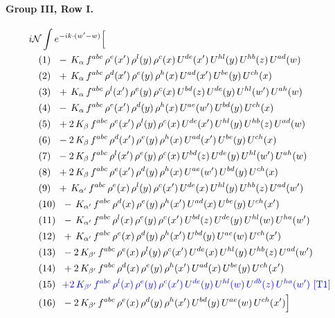 \documentclass[10pt]{article}
\numberwithin{equation}{section}
\newcommand{\NN}{\mathcal N}
\begin{document}
\paragraph{Group III, Row I.}
\begin{align*}
&i\NN\int e^{-ik\cdot(w'-w)}\Big[\\
&\quad\text{(1)}\ \ -\,K_{\alpha}\,f^{abc}\,\rho^{e}(x')\,\rho^{l}(y)\,\rho^{c}(x)\,U^{de}(x')\,U^{hl}(y)\,U^{hb}(z)\,U^{ad}(w)\\
&\quad\text{(2)}\ \ +\,K_{\alpha}\,f^{abc}\,\rho^{d}(x')\,\rho^{e}(y)\,\rho^{h}(x)\,U^{ad}(x')\,U^{be}(y)\,U^{ch}(x)\\
&\quad\text{(3)}\ \ +\,K_{\alpha}\,f^{abc}\,\rho^{l}(x')\,\rho^{e}(y)\,\rho^{c}(x)\,U^{bd}(z)\,U^{de}(y)\,U^{hl}(w')\,U^{ah}(w)\\
&\quad\text{(4)}\ \ -\,K_{\alpha}\,f^{abc}\,\rho^{e}(x')\,\rho^{d}(y)\,\rho^{h}(x)\,U^{ae}(w')\,U^{bd}(y)\,U^{ch}(x)\\
&\quad\text{(5)}\ \ +2\,K_{\beta}\,f^{abc}\,\rho^{e}(x')\,\rho^{l}(y)\,\rho^{c}(x)\,U^{de}(x')\,U^{hl}(y)\,U^{hb}(z)\,U^{ad}(w)\\
&\quad\text{(6)}\ \ -2\,K_{\beta}\,f^{abc}\,\rho^{d}(x')\,\rho^{e}(y)\,\rho^{h}(x)\,U^{ad}(x')\,U^{be}(y)\,U^{ch}(x)\\
&\quad\text{(7)}\ \ -2\,K_{\beta}\,f^{abc}\,\rho^{l}(x')\,\rho^{e}(y)\,\rho^{c}(x)\,U^{bd}(z)\,U^{de}(y)\,U^{hl}(w')\,U^{ah}(w)\\
&\quad\text{(8)}\ \ +2\,K_{\beta}\,f^{abc}\,\rho^{e}(x')\,\rho^{d}(y)\,\rho^{h}(x)\,U^{ae}(w')\,U^{bd}(y)\,U^{ch}(x)\\
&\quad\text{(9)}\ \ +\,K_{\alpha'}\,f^{abc}\,\rho^{e}(x)\,\rho^{l}(y)\,\rho^{c}(x')\,U^{de}(x)\,U^{hl}(y)\,U^{hb}(z)\,U^{ad}(w')\\
&\quad\text{(10)}\ \ -\,K_{\alpha'}\,f^{abc}\,\rho^{d}(x)\,\rho^{e}(y)\,\rho^{h}(x')\,U^{ad}(x)\,U^{be}(y)\,U^{ch}(x')\\
&\quad\text{(11)}\ \ -\,K_{\alpha'}\,f^{abc}\,\rho^{l}(x)\,\rho^{e}(y)\,\rho^{c}(x')\,U^{bd}(z)\,U^{de}(y)\,U^{hl}(w)\,U^{ha}(w')\\
&\quad\text{(12)}\ \ +\,K_{\alpha'}\,f^{abc}\,\rho^{e}(x)\,\rho^{d}(y)\,\rho^{h}(x')\,U^{bd}(y)\,U^{ae}(w)\,U^{ch}(x')\\
&\quad\text{(13)}\ \ -2\,K_{\beta'}\,f^{abc}\,\rho^{e}(x)\,\rho^{l}(y)\,\rho^{c}(x')\,U^{de}(x)\,U^{hl}(y)\,U^{hb}(z)\,U^{ad}(w')\\
&\quad\text{(14)}\ \ +2\,K_{\beta'}\,f^{abc}\,\rho^{d}(x)\,\rho^{e}(y)\,\rho^{h}(x')\,U^{ad}(x)\,U^{be}(y)\,U^{ch}(x')\\
&\quad\text{(15)}\ \ \textcolor{blue}{+2\,K_{\beta'}\,f^{abc}\,\rho^{l}(x)\,\rho^{e}(y)\,\rho^{c}(x')\,U^{de}(y)\,U^{hl}(w)\,U^{db}(z)\,U^{ha}(w')}\ \text{\textcolor{blue}{[T1]}}\\
&\quad\text{(16)}\ \ -2\,K_{\beta'}\,f^{abc}\,\rho^{e}(x)\,\rho^{d}(y)\,\rho^{h}(x')\,U^{bd}(y)\,U^{ae}(w)\,U^{ch}(x')\Big]
\end{align*}
\end{document}

